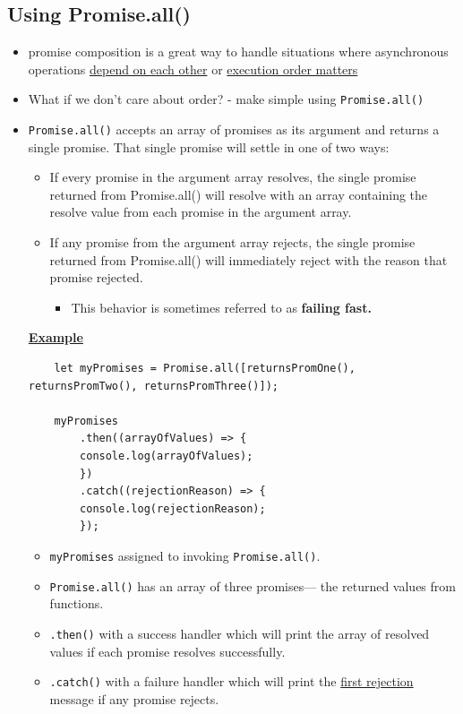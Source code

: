 \documentclass[12pt]{article}
\begin{document}
\subsection{Using Promise.all()}

\begin{itemize}
    \item promise composition is a great way to handle situations where asynchronous
    operations \ul{depend on each other} or \ul{execution order matters}
    \item What if we don't care about order? - make simple using \texttt{Promise.all()}
    \item \texttt{Promise.all()} accepts an array of promises as its argument and returns a single promise. That single promise will settle in one of two ways:
    \begin{itemize}
        \item If every promise in the argument array resolves, the single promise returned from Promise.all() will resolve with an array containing the resolve value from each promise in the argument array.
        \item If any promise from the argument array rejects, the single promise returned from Promise.all() will immediately reject with the reason that promise rejected.
        \begin{itemize}
            \item This behavior is sometimes referred to as \textbf{failing fast.}
        \end{itemize}
    \end{itemize}

    \underline{\textbf{Example}}

    \begin{lstlisting}
    let myPromises = Promise.all([returnsPromOne(), returnsPromTwo(), returnsPromThree()]);

    myPromises
        .then((arrayOfValues) => {
        console.log(arrayOfValues);
        })
        .catch((rejectionReason) => {
        console.log(rejectionReason);
        });
    \end{lstlisting}

    \begin{itemize}
        \item \texttt{myPromises} assigned to invoking \texttt{Promise.all()}.
        \item \texttt{Promise.all()} has an array of three promises— the returned values from functions.
        \item \texttt{.then()} with a success handler which will print the array of resolved values if each promise resolves successfully.
        \item \texttt{.catch()} with a failure handler which will print the \ul{first rejection} message if any promise rejects.

    \end{itemize}

\end{itemize}
\end{document}
